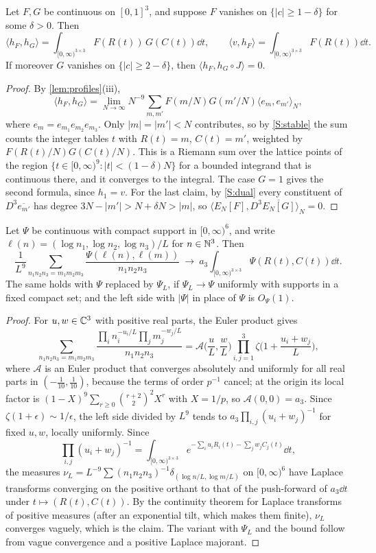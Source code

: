 \documentclass[11pt,colorlinks]{charlie}
\newcommand{\ip}[2]{\langle #1,#2\rangle}
\begin{document}
\begin{lemma}\label{lem:stable}
Let $F,G$ be continuous on $[0,1]^3$, and suppose $F$ vanishes on $\{|c|\ge1-\delta\}$ for some $\delta>0$. Then
\[
 \ip{h_F}{h_G}=\int_{[0,\infty)^{3\times3}}F(R(t))\,G(C(t))\dd t,\qquad \ip{v}{h_F}=\int_{[0,\infty)^{3\times3}}F(R(t))\dd t .
\]
If moreover $G$ vanishes on $\{|c|\ge2-\delta\}$, then $\ip{h_F}{h_G\circ J}=0$.
\end{lemma}
\begin{proof}
By \cref{lem:profiles}(iii),\[\ip{h_F}{h_G}=\lim_{N\to\infty} N^{-9}\sum_{m,m'}F(m/N)G(m'/N)\ip{e_m}{e_{m'}}_N,\]where $e_m=e_{m_1}e_{m_2}e_{m_3}$. Only $|m|=|m'|<N$ contributes, so by \ref{S:stable} the sum counts the integer tables $t$ with $R(t)=m$, $C(t)=m'$, weighted by $F(R(t)/N)G(C(t)/N)$. This is a Riemann sum over the lattice points of the region $\{t\in[0,\infty)^9:|t|<(1-\delta)N\}$ for a bounded integrand that is continuous there, and it converges to the integral. The case $G=1$ gives the second formula, since $h_1=v$. For the last claim, by \ref{S:dual} every constituent of $D^3\overline{e_{m'}}$ has degree $3N-|m'|>N+\delta N>|m|$, so $\ip{E_N[F]}{D^3\overline{E_N[G]}}_N=0$.
\end{proof}

\begin{lemma}\label{lem:diagonal}
Let $\Psi$ be continuous with compact support in $[0,\infty)^6$, and write $\ell(n)=(\log n_1,\log n_2,\log n_3)/L$ for $n\in\mathbb{N}^3$. Then
\[
 \frac1{L^9}\sum_{n_1n_2n_3=m_1m_2m_3}\frac{\Psi(\ell(n),\ell(m))}{n_1n_2n_3}\ \longrightarrow\ a_3\int_{[0,\infty)^{3\times3}}\Psi(R(t),C(t))\dd t .
\]
The same holds with $\Psi$ replaced by $\Psi_L$, if $\Psi_L\to\Psi$ uniformly with supports in a fixed compact set; and the left side with $|\Psi|$ in place of $\Psi$ is $O_\Psi(1)$.
\end{lemma}
\begin{proof}
For $u,w\in\mathbb{C}^3$ with positive real parts, the Euler product gives
\[
 \sum_{n_1n_2n_3=m_1m_2m_3}\frac{\prod_in_i^{-u_i/L}\prod_jm_j^{-w_j/L}}{n_1n_2n_3}=\mathcal A\Big(\frac uL,\frac wL\Big)\prod_{i,j=1}^3\zeta\Big(1+\frac{u_i+w_j}L\Big),
\]
where $\mathcal A$ is an Euler product that converges absolutely and uniformly for all real parts in $(-\frac1{10},\frac1{10})$, because the terms of order $p^{-1}$ cancel; at the origin its local factor is $(1-X)^9\sum_{r\ge0}\binom{r+2}2^2X^r$ with $X=1/p$, so $\mathcal A(0,0)=a_3$. Since $\zeta(1+\epsilon)\sim1/\epsilon$, the left side divided by $L^9$ tends to $a_3\prod_{i,j}(u_i+w_j)^{-1}$ for fixed $u,w$, locally uniformly. Since
\[
 \prod_{i,j}(u_i+w_j)^{-1}=\int_{[0,\infty)^{3\times3}}e^{-\sum_iu_iR_i(t)-\sum_jw_jC_j(t)}\dd t,
\]
the measures $\nu_L=L^{-9}\sum(n_1n_2n_3)^{-1}\delta_{(\log n/L,\log m/L)}$ on $[0,\infty)^6$ have Laplace transforms converging on the positive orthant to that of the push-forward of $a_3\dd t$ under $t\mapsto(R(t),C(t))$. By the continuity theorem for Laplace transforms of positive measures (after an exponential tilt, which makes them finite), $\nu_L$ converges vaguely, which is the claim. The variant with $\Psi_L$ and the bound follow from vague convergence and a positive Laplace majorant.
\end{proof}
\end{document}
